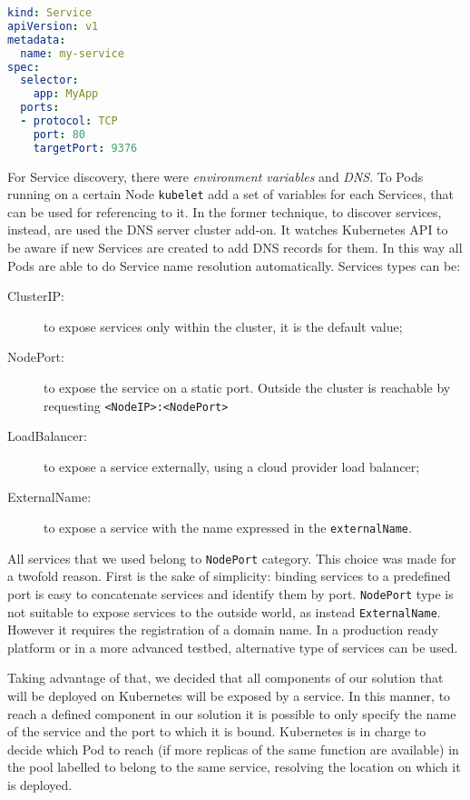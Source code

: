 \begin{lstlisting}[caption={Example of Service definition},
                   captionpos=b, language=yaml, label=chap:impl:lst:srv]
kind: Service
apiVersion: v1
metadata:
  name: my-service
spec:
  selector:
    app: MyApp
  ports:
  - protocol: TCP
    port: 80
    targetPort: 9376
\end{lstlisting}

For Service discovery, there were \emph{environment variables} and \emph{DNS}.
To Pods running on a certain Node \texttt{kubelet} add a set of variables for
each Services, that can be used for referencing to it. In the former technique,
to discover services, instead, are used the DNS server cluster add-on. It
watches Kubernetes API to be aware if new Services are created to add DNS
records for them. In this way all Pods are able to do Service name resolution
automatically. Services types can be:
\begin{description}
\item[ClusterIP:] to expose services only within the cluster, it is the default
value;
\item[NodePort:] to expose the service on a static port. Outside the cluster is
reachable by requesting \verb!<NodeIP>:<NodePort>!
\item[LoadBalancer:] to expose a service externally, using a cloud provider
load balancer;
\item[ExternalName:] to expose a service with the name expressed in the 
\texttt{externalName}.
\end{description}

All services that we used belong to \texttt{NodePort} category. This choice was
made for a twofold reason. First is the sake of simplicity: binding services to
a predefined port is easy to concatenate services and identify them by port.
\texttt{NodePort} type is not suitable to expose services to the outside world,
as instead \texttt{ExternalName}. However it requires the registration of a
domain name. In a production ready platform or in a more advanced testbed,
alternative type of services can be used.

Taking advantage of that, we decided that all components of our solution that
will be deployed on Kubernetes will be exposed by a service. In this manner, to
reach a defined component in our solution it is possible to only specify the
name of the service and the port to which it is bound. Kubernetes is in charge
to decide which Pod to reach (if more replicas of the same function are
available) in the pool labelled to belong to the same service, resolving the
location on which it is deployed.

